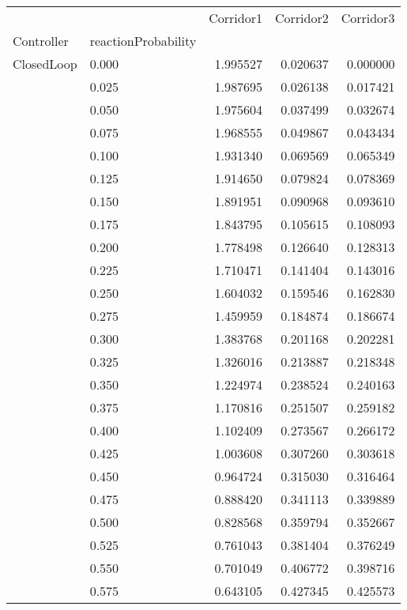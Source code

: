\begin{tabular}{llrrr}
\toprule
         &       &  Corridor1 &  Corridor2 &  Corridor3 \\
Controller & reactionProbability &            &            &            \\
\midrule
ClosedLoop & 0.000 &   1.995527 &   0.020637 &   0.000000 \\
         & 0.025 &   1.987695 &   0.026138 &   0.017421 \\
         & 0.050 &   1.975604 &   0.037499 &   0.032674 \\
         & 0.075 &   1.968555 &   0.049867 &   0.043434 \\
         & 0.100 &   1.931340 &   0.069569 &   0.065349 \\
         & 0.125 &   1.914650 &   0.079824 &   0.078369 \\
         & 0.150 &   1.891951 &   0.090968 &   0.093610 \\
         & 0.175 &   1.843795 &   0.105615 &   0.108093 \\
         & 0.200 &   1.778498 &   0.126640 &   0.128313 \\
         & 0.225 &   1.710471 &   0.141404 &   0.143016 \\
         & 0.250 &   1.604032 &   0.159546 &   0.162830 \\
         & 0.275 &   1.459959 &   0.184874 &   0.186674 \\
         & 0.300 &   1.383768 &   0.201168 &   0.202281 \\
         & 0.325 &   1.326016 &   0.213887 &   0.218348 \\
         & 0.350 &   1.224974 &   0.238524 &   0.240163 \\
         & 0.375 &   1.170816 &   0.251507 &   0.259182 \\
         & 0.400 &   1.102409 &   0.273567 &   0.266172 \\
         & 0.425 &   1.003608 &   0.307260 &   0.303618 \\
         & 0.450 &   0.964724 &   0.315030 &   0.316464 \\
         & 0.475 &   0.888420 &   0.341113 &   0.339889 \\
         & 0.500 &   0.828568 &   0.359794 &   0.352667 \\
         & 0.525 &   0.761043 &   0.381404 &   0.376249 \\
         & 0.550 &   0.701049 &   0.406772 &   0.398716 \\
         & 0.575 &   0.643105 &   0.427345 &   0.425573 \\

\end{tabular}
